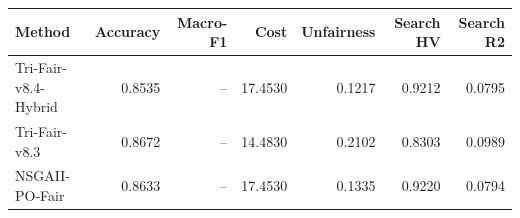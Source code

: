 \begin{tabular}{lrrrrrr}
\hline
Method & Accuracy & Macro-F1 & Cost & Unfairness & Search HV & Search R2 \\
\hline
Tri-Fair-v8.4-Hybrid & 0.8535 & -- & 17.4530 & 0.1217 & 0.9212 & 0.0795 \\
Tri-Fair-v8.3 & 0.8672 & -- & 14.4830 & 0.2102 & 0.8303 & 0.0989 \\
NSGAII-PO-Fair & 0.8633 & -- & 17.4530 & 0.1335 & 0.9220 & 0.0794 \\
\hline
\end{tabular}